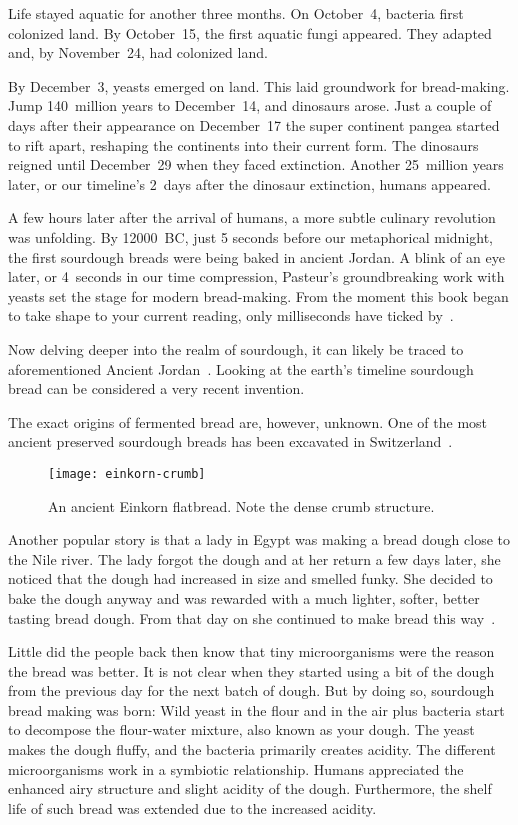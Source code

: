 Life stayed aquatic for another three months.
On October~4, bacteria first colonized land. By October~15, the
first aquatic fungi appeared. They adapted and, by November~24, had colonized
land.

By December~3, yeasts emerged on land. This laid groundwork for bread-making.
Jump 140~million years to December~14, and dinosaurs arose. Just a couple
of days after their appearance on December~17 the super continent pangea
started to rift apart, reshaping the continents into their current form.
The dinosaurs reigned until December~29 when they faced extinction.
Another 25~million years later, or our timeline's 2~days after the dinosaur
extinction, humans appeared.

A few hours later after the arrival of humans, a more subtle culinary
revolution was unfolding. By  \num{12000}~BC, just 5 seconds before our metaphorical
midnight, the first sourdough breads were being baked in ancient Jordan. A blink of
an eye later, or 4~seconds in our time compression, Pasteur's groundbreaking work
with yeasts set the stage for modern bread-making. From the moment this book
began to take shape to your current reading, only milliseconds have ticked by~\cite{Yong_2017}.

Now delving deeper into the realm of sourdough, it can likely be traced to aforementioned
Ancient Jordan~\cite{jordan+bread}. Looking at the earth's timeline sourdough
bread can be considered a very recent invention.

The exact origins of fermented
bread are, however, unknown. One of the most ancient preserved
sourdough breads has been excavated in Switzerland~\cite{switzerland+bread}.

\begin{figure}[ht]
  \texttt{[image: einkorn-crumb]}
  \caption[Ancient Einkorn flatbread]{An ancient Einkorn flatbread. Note the
      dense crumb structure.}%
  \label{einkorn-crumb}
\end{figure}

Another popular story is that a lady in Egypt was making
a bread dough close to the Nile river. The lady forgot the
dough and at her return a few days later, she noticed that the dough had
increased in size and smelled funky. She decided to bake
the dough anyway and was rewarded with a much
lighter, softer, better tasting bread dough. From that day
on she continued to make bread this way~\cite{egyptian+bread}.

Little did the people back then know that tiny microorganisms
were the reason the bread was better. It is not clear when
they started using a bit of the dough from the previous
day for the next batch of dough. But by doing so, sourdough
bread making was born: Wild yeast in the flour and in the air
plus bacteria start to decompose the flour-water mixture, also
known as your dough. The yeast makes the dough fluffy, and
the bacteria primarily creates acidity. The different
microorganisms work in a symbiotic relationship. Humans
appreciated the enhanced airy structure and slight acidity
of the dough. Furthermore, the shelf life of such bread
was extended due to the increased acidity.

